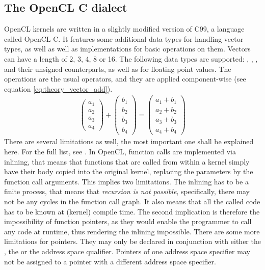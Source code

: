 \subsection{The OpenCL C dialect}
\label{sect:theory_opencl_c}
OpenCL kernels are written in a slightly modified version of C99, a language called OpenCL C. It features some additional data types for handling vector types, as well as well as implementations for basic operations on them. Vectors can have a length of 2, 3, 4, 8 or 16. The following data types are supported: , , ,  and their unsigned counterparts, as well as  for floating point values. The operations are the usual operators, and they are applied component-wise (see equation \ref{eq:theory_vector_add}). \cite{khronos2012specification} 
\begin{gather}
	\label{eq:theory_vector_add}
	\begin{pmatrix}
		a_1\\
		a_2\\
		a_3\\
		a_4
	\end{pmatrix} + 
	\begin{pmatrix}
		b_1\\
		b_2\\
		b_3\\
		b_4
	\end{pmatrix} =
	\begin{pmatrix}
	a_1+b_1\\
	a_2+b_2\\
	a_3+b_3\\
	a_4+b_4
	\end{pmatrix}
\end{gather}
There are several limitations as well, the most important one shall be explained here. For the full list, see \cite{khronos2012specification}. In OpenCL, function calls are implemented via inlining, that means that functions that are called from within a kernel simply have their body copied into the original kernel, replacing the parameters by the function call arguments. This implies two limitations. The inlining has to be a finite process, that means that \emph{recursion is not possible}, specifically, there may not be any cycles in the function call graph. It also means that all the called code has to be known at (kernel) compile time. The second implication is therefore the impossibility of function pointers, as they would enable the programmer to call any code at runtime, thus rendering the inlining impossible. There are some more limitations for pointers. They may only be declared in conjunction with either the , the  or the  address space qualifier. Pointers of one address space specifier may not be assigned to a pointer with a different address space specifier.  \cite{khronos2012specification} \\ %

